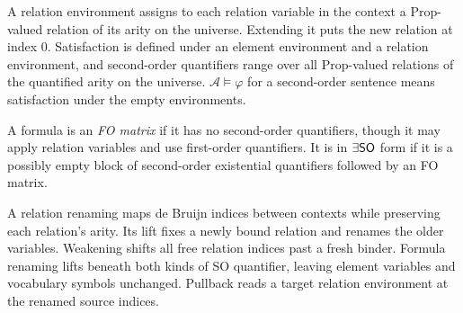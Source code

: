 \begin{definition}
  \label{def:desc-so-semantics}
  \leanok
  A relation environment assigns to each relation variable in the context a
  $\mathrm{Prop}$-valued relation of its arity on the universe. Extending it puts
  the new relation at index $0$. Satisfaction is defined under an element
  environment and a relation environment, and second-order quantifiers range over
  all $\mathrm{Prop}$-valued relations of the quantified arity on the universe.
  $\mathcal{A} \models \varphi$ for a second-order sentence means satisfaction
  under the empty environments.
\end{definition}

\begin{definition}
  \label{def:desc-existential-so}
  \leanok
  A formula is an \emph{FO matrix} if it has no second-order quantifiers, though
  it may apply relation variables and use first-order quantifiers. It is in
  $\exists\mathsf{SO}$ form if it is a possibly empty block of second-order
  existential quantifiers followed by an FO matrix.
\end{definition}

\begin{definition}
  \label{def:desc-so-renaming}
  \leanok
  A relation renaming maps de Bruijn indices between contexts while preserving
  each relation's arity. Its lift fixes a newly bound relation and renames the
  older variables. Weakening shifts all free relation indices past a fresh
  binder. Formula renaming lifts beneath both kinds of SO quantifier, leaving
  element variables and vocabulary symbols unchanged. Pullback reads a target
  relation environment at the renamed source indices.
\end{definition}

